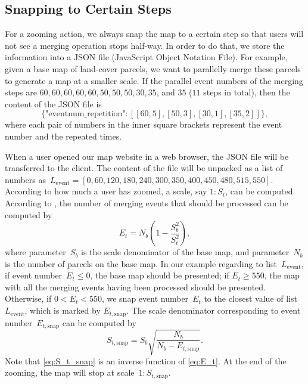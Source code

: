 \documentclass[ijgi,article,submit,moreauthors,pdftex]{Definitions/mdpi}
\begin{document}


\subsection{Snapping to Certain Steps}
\label{sec:snap}

For a zooming action, 
we always snap the map to a certain step
so that users will not see a merging operation stops half-way.
In order to do that, we store the information into 
a JSON file (JavaScript Object Notation File).
For example, given a base map of land-cover parcels,
we want to parallelly merge these parcels to generate a map
at a smaller scale.
If the parallel event numbers of the merging steps are 
$60, 60, 60, 60, 60, 50, 50, 50, 30, 35$, and $35$ ($11$ steps in total),
then the content of the JSON file is
$$\{\textrm{"eventnum\_repetition"}: [[60, 5], [50, 3], [30, 1], [35, 2]]\},$$
where each pair of numbers in the inner square brackets 
represent the event number and the repeated times.


When a user opened our map website in a web browser,
the JSON file will be transferred to the client.
The content of the file will be unpacked as a list of numbers 
as~$L_\mathrm{event} = 
[0, 60, 120, 180, 240, 300, 350, 400, 450, 480, 515, 550]$.
According to how much a user has zoomed,
a scale, say $1:S_t$, can be computed.
According to \citet{Huang2016Webmap},
the number of merging events that should be processed can be computed by
\begin{equation}
\label{eq:E_t}
E_t = N_b \left(1-\frac{S^2_b}{S^2_t}\right),
\end{equation}
where parameter~$S_b$ is the scale denominator of the base map,
and parameter~$N_b$ is the number of parcels on the base map.
In our example regarding to list~$L_\mathrm{event}$,
if event number~$E_t \le 0$, the base map should be presented;
if $E_t \ge 550$, the map with all the merging events having been processed
should be presented.
Otherwise, if $0<E_t < 550$, we snap event number~$E_t$ 
to the closest value of list~$L_\mathrm{event}$,
which is marked by $E_{t,\mathrm{snap}}$.
The scale denominator corresponding to event number~$E_{t,\mathrm{snap}}$
can be computed by 
\begin{equation}
\label{eq:S_t_snap}
S_{t,\mathrm{snap}} = S_b \sqrt{\frac{N_b}{N_b-E_{t,\mathrm{snap}}}}.
\end{equation}
Note that \eq\ref{eq:S_t_snap} is an inverse function of \eq\ref{eq:E_t}.
At the end of the zooming, the map will stop at scale~$1:S_{t,\mathrm{snap}}$.
\end{document}
